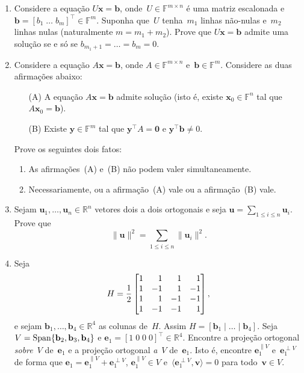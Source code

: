 \documentclass[11pt,reqno,a4paper]{amsart}
\def\RR{{\mathbb R}}
\def\FF{{\mathbb F}}
\def\bfb{\mathbf{b}}
\def\bfe{\mathbf{e}}
\def\bfu{\mathbf{u}}
\def\bfv{\mathbf{v}}
\def\bfx{\mathbf{x}}
\def\bfy{\mathbf{y}}
\def\bfzero{\mathbf{0}}
\def\<{\langle}
\def\>{\rangle}
\def\Span{\mathop{\rm Span}}
\def\rmlabel{\upshape({\itshape \roman*\,})}
\newcommand\nlabelQ{\bf\upshape Q\arabic*}
\begin{document}
\begin{enumerate}[label=\nlabelQ]
\item Considere a equação $U\bfx=\bfb$, onde~$U\in\FF^{m\times n}$ é
  uma matriz escalonada e~$\bfb=[b_1\;\dots\;b_m]^\top\in\FF^m$.
  Suponha que~$U$ tenha~$m_1$ linhas não-nulas e~$m_2$ linhas nulas
  (naturalmente $m=m_1+m_2$).  Prove que $U\bfx=\bfb$ admite uma
  solução se e só se $b_{m_1+1}=\dots=b_m=0$.

\item Considere a equação $A\bfx=\bfb$, onde $A\in\FF^{m\times n}$
  e~$\bfb\in\FF^m$.  Considere as duas afirmações abaixo:
  \begin{enumerate}
  \item[(A)] A equação $A\bfx=\bfb$ admite solução (isto é, existe
    $\bfx_0\in\FF^n$ tal que $A\bfx_0=\bfb$).
  \item[(B)] Existe $\bfy\in\FF^m$ tal que $\bfy^\top A=\bfzero$ e
    $\bfy^\top\bfb\neq0$. 
  \end{enumerate}
  Prove os seguintes dois fatos:
  \begin{enumerate}[label=\rmlabel]
  \item As afirmações~(A) e~(B) não podem valer simultaneamente.
  \item Necessariamente, ou a afirmação~(A) vale ou a afirmação~(B)
    vale.
  \end{enumerate}

\item Sejam $\bfu_1,\dots,\bfu_n\in\RR^n$ vetores dois a dois
  ortogonais e seja $\bfu=\sum_{1\leq i\leq n}\bfu_i$.  Prove que
  \begin{equation}
    \label{eq:2}
    \|\bfu\|^2=\sum_{1\leq i\leq n}\|\bfu_i\|^2.
  \end{equation}
  
\item Seja
    \begin{equation}
    \label{eq:H4}
    H={1\over2}
    \begin{bmatrix*}[r]
      1&1&1&1\\
      1&-1&1&-1\\
      1&1&-1&-1\\
      1&-1&-1&1\\
    \end{bmatrix*}, 
  \end{equation}
  e sejam $\bfb_1,\dots,\bfb_4\in\RR^4$ as colunas de~$H$.  Assim
  $H=[\bfb_1\mid\dots\mid\bfb_4]$.
  Seja~$V=\Span\{\bfb_2,\bfb_3,\bfb_4\}$ e
  $\bfe_1=[1\;0\; 0\; 0]^\top\in\RR^4$.  Encontre a projeção ortogonal
  \textit{sobre}~$V$ de~$\bfe_1$ e a projeção ortogonal \textit{a}~$V$
  de~$\bfe_1$.  Isto é, encontre $\bfe_1^{\parallel V}$
  e~$\bfe_1^{\perp V}$ de forma que
  $\bfe_1=\bfe_1^{\parallel V}+\bfe_1^{\perp V}$,
  $\bfe_1^{\parallel V}\in V$ e~$\<\bfe_1^{\perp V},\bfv\>=0$ para
  todo~$\bfv\in V$.
  

\end{enumerate}
\end{document}
